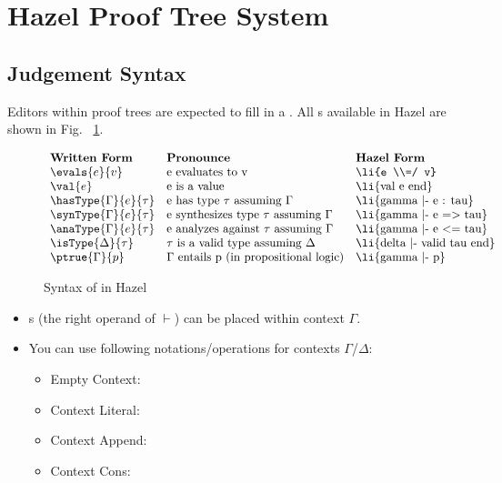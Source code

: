 \section{Hazel Proof Tree System}\label{release-note}

\subsection{Judgement Syntax}\label{derivation-tree-building-blocks}

Editors within proof trees are expected to fill in a . All s available in Hazel are shown in Fig. ~\ref{fig:jdmt-syntax}.

\begin{figure}[ht]
\[\begin{array}{lll}
\textbf{Written Form} & \textbf{Pronounce} & \textbf{Hazel Form} \\
\evals{e}{v} & \text{e evaluates to v} & \text{\li{e \\=/ v}} \\
\val{e} & \text{e is a value} & \text{\li{val e end}} \\
\hasType{\Gamma}{e}{\tau} & \text{e has type $\tau$ assuming $\Gamma$} &
\text{\li{gamma |- e : tau}} \\
\synType{\Gamma}{e}{\tau} & \text{e synthesizes type $\tau$ assuming $\Gamma$} &
\text{\li{gamma |- e => tau}} \\ 
\anaType{\Gamma}{e}{\tau} & \text{e analyzes against $\tau$ assuming $\Gamma$} &
\text{\li{gamma |- e <= tau}} \\
\isType{\Delta}{\tau} & \text{$\tau$ is a valid type assuming $\Delta$} &
\text{\li{delta |- valid tau end}} \\
\ptrue{\Gamma}{p} & \text{$\Gamma$ entails p (in propositional logic)} &
\text{\li{gamma |- p}} \\
\end{array}\]
\vspace{-10px}
\caption{Syntax of  in Hazel}
\label{fig:jdmt-syntax}
\end{figure}

\begin{itemize}
\item
  s (the right operand of $\vdash$) can be
  placed within context $\Gamma$.
\item
  You can use following notations/operations for contexts
  $\Gamma$/$\Delta$:
  \begin{itemize}
  \item
    Empty Context: \text{\li{[]}}
  \item
    Context Literal: \text{\li{[p1, p2, ...]}}
  \item
    Context Append: 
  \item
    Context Cons: 
  \end{itemize}
\end{itemize}

